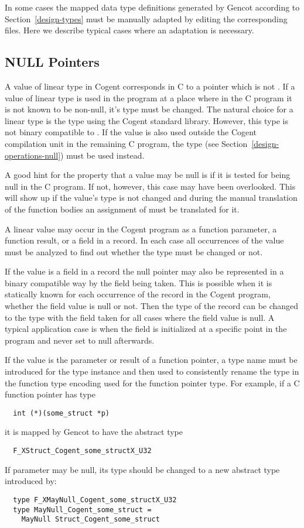 In some cases the mapped data type definitions generated by Gencot according to Section~\ref{design-types} must be manually
adapted by editing the corresponding  files. Here we describe typical cases where an adaptation is
necessary.

\subsection{NULL Pointers}
\label{app-transtype-null}

A value of linear type in Cogent corresponds in C to a pointer which is not . 
If a value of linear type is used in the program at a place where in the C program it is not known to be non-null, it's type
must be changed. The natural choice for a linear type  is the type  using the Cogent standard library.
However, this type is not binary compatible to . If the value is also used outside the Cogent compilation unit 
in the remaining C program, the type  (see Section~\ref{design-operations-null}) must be used instead.

A good hint for the property that a value may be null is if it is tested for being null in the C program. If not, however,
this case may have been overlooked. This will show up if the value's type is not changed and during the manual translation
of the function bodies an assignment of  must be translated for it.

A linear value may occur in the Cogent program as a function parameter, a function result, or a field in a record. In each case
all occurrences of the value must be analyzed to find out whether the type must be changed or not.

If the value is a field in a record the null pointer may also be represented in a binary compatible way by the field being
taken. This is possible when 
it is statically known for each occurrence of the record in the Cogent program, whether the field value is null or not. 
Then the type of the record can be changed to the type with the field taken for all cases where the field value is null.
A typical application case is when the field is initialized at a specific point in the program and never set to null
afterwards.

If the value is the parameter or result of a function pointer, a type name must be introduced 
for the  type instance and then used to consistently rename the type in the function type encoding used
for the function pointer type. For example, if a C function pointer has type
\begin{verbatim}
  int (*)(some_struct *p)
\end{verbatim}
it is mapped by Gencot to have the abstract type
\begin{verbatim}
  F_XStruct_Cogent_some_structX_U32
\end{verbatim}
If parameter  may be null, its type should be changed to a new abstract type introduced by:
\begin{verbatim}
  type F_XMayNull_Cogent_some_structX_U32
  type MayNull_Cogent_some_struct = 
    MayNull Struct_Cogent_some_struct
\end{verbatim}

